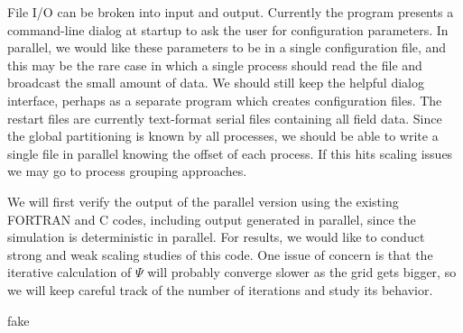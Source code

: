 \documentclass{article}
\begin{document}
File I/O can be broken into input and output.
Currently the program presents a command-line dialog at startup
to ask the user for configuration parameters.
In parallel, we would like these parameters to be in a single
configuration file, and this may be the rare case in which a single
process should read the file and broadcast the small amount of data.
We should still keep the helpful dialog interface, perhaps as a separate
program which creates configuration files.
The restart files are currently text-format serial files containing
all field data.
Since the global partitioning is known by all processes, we should
be able to write a single file in parallel knowing the offset of
each process.
If this hits scaling issues we may go to process grouping approaches.

We will first verify the output of the parallel version using the
existing FORTRAN and C codes, including output generated in parallel,
since the simulation is deterministic in parallel.
For results, we would like to conduct strong and weak scaling studies
of this code.
One issue of concern is that the iterative calculation of $\Psi$ will
probably converge slower as the grid gets bigger, so we will keep
careful track of the number of iterations and study its behavior.

fake
\end{document}
